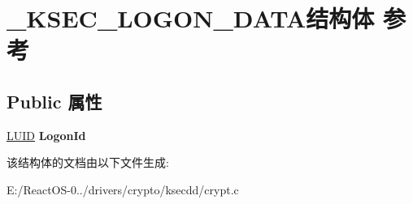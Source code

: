 \hypertarget{struct___k_s_e_c___l_o_g_o_n___d_a_t_a}{}\section{\+\_\+\+K\+S\+E\+C\+\_\+\+L\+O\+G\+O\+N\+\_\+\+D\+A\+T\+A结构体 参考}
\label{struct___k_s_e_c___l_o_g_o_n___d_a_t_a}
\subsection*{Public 属性}
\begin{DoxyCompactItemize}
\item 
\mbox{\label{struct___k_s_e_c___l_o_g_o_n___d_a_t_a_ac1c9b9b076c7b16b0a48f8f8699136f8}} 
\hyperlink{struct___l_u_i_d}{L\+U\+ID} {\bfseries Logon\+Id}
\end{DoxyCompactItemize}


该结构体的文档由以下文件生成\+:\begin{DoxyCompactItemize}
\item 
E\+:/\+React\+O\+S-\/0../drivers/crypto/ksecdd/crypt.\+c\end{DoxyCompactItemize}
